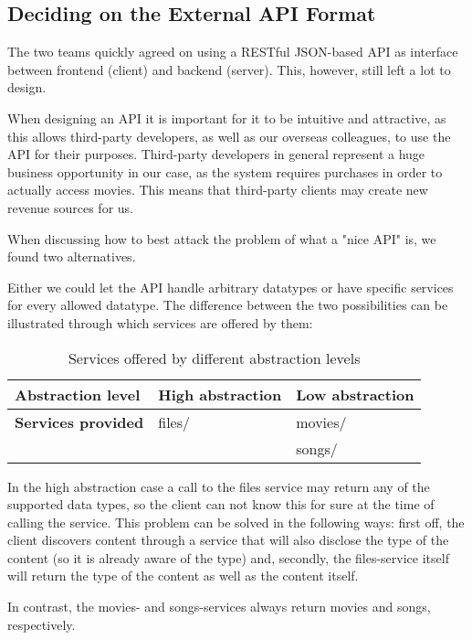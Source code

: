 \subsection{Deciding on the External API Format}

The two teams quickly agreed on using a RESTful JSON-based API as interface between
frontend (client) and backend (server). This, however, still left a lot to design.

When designing an API it is important for it to be intuitive and attractive, as this
allows third-party developers, as well as our overseas colleagues, to use the API for
their purposes. Third-party developers in general represent a huge business opportunity
in our case, as the system requires purchases in order to actually access movies. This
means that third-party clients may create new revenue sources for us.

When discussing how to best attack the problem of what a "nice API" is, we found two
alternatives.

Either we could let the API handle arbitrary datatypes or have specific services for
every allowed datatype. The difference between the two possibilities can be illustrated
through which services are offered by them:

\begin{table}[h]
    \begin{tabular}{ | l | l | l | }
        \hline
        \textbf{Abstraction level} & High abstraction & Low abstraction \\
        \hline
        \textbf{Services provided} & files/ & movies/ \\
        &  & songs/ \\
        \hline
    \end{tabular}
    \caption{Services offered by different abstraction levels}
\end{table}

In the high abstraction case a call to the files service may return any of the supported
data types, so the client can not know this for sure at the time of calling the service.
This problem can be solved in the following ways: first off, the client discovers content
through a service that will also disclose the type of the content (so it is already aware
of the type) and, secondly, the files-service itself will return the type of the content
as well as the content itself.

In contrast, the movies- and songs-services always return movies and songs, respectively.

